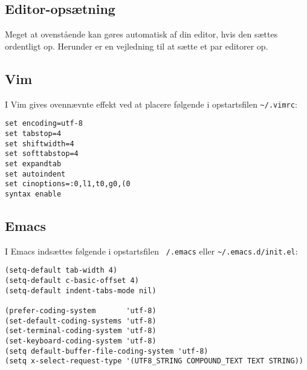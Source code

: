\documentclass[article, 10pt]{memoir}
\begin{document}
\begin{multicols}{2}
    \section{Editor-opsætning}
    Meget at ovenstående kan gøres automatisk af din editor, hvis den sættes ordentligt op. Herunder er en vejledning til at sætte et par editorer op.

    \subsection{Vim}
    I Vim gives ovennævnte effekt ved at placere følgende i opstartsfilen \verb|~/.vimrc|:
    \begin{lstlisting}
set encoding=utf-8
set tabstop=4
set shiftwidth=4
set softtabstop=4
set expandtab
set autoindent
set cinoptions=:0,l1,t0,g0,(0
syntax enable
    \end{lstlisting}

    \subsection{Emacs}
    I Emacs indsættes følgende i opstartsfilen \texttt{~/.emacs} eller \verb|~/.emacs.d/init.el|:
    \begin{lstlisting}
(setq-default tab-width 4)
(setq-default c-basic-offset 4)
(setq-default indent-tabs-mode nil)

(prefer-coding-system       'utf-8)
(set-default-coding-systems 'utf-8)
(set-terminal-coding-system 'utf-8)
(set-keyboard-coding-system 'utf-8)
(setq default-buffer-file-coding-system 'utf-8)
(setq x-select-request-type '(UTF8_STRING COMPOUND_TEXT TEXT STRING))
    \end{lstlisting}


\end{multicols}
\end{document}
